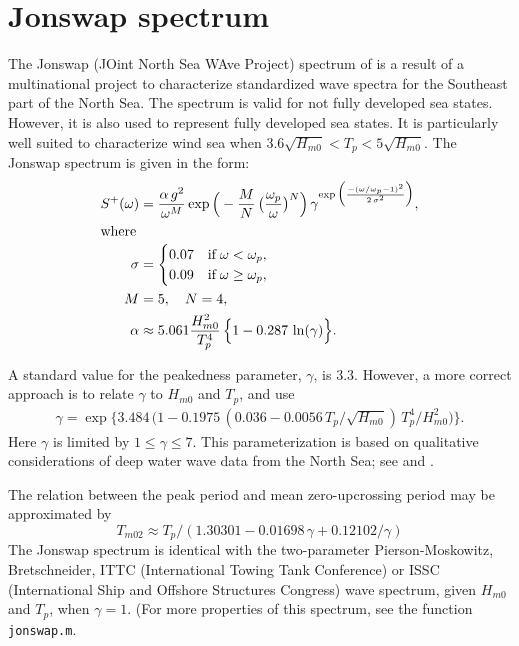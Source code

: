 \section{{\sc Jonswap} spectrum}
\label{sec:jonswap}
The {\sc Jonswap} (JOint North Sea WAve Project) spectrum of
\cite{HasselmannEtal1973Measurements}  is a result of a
multinational project to characterize standardized wave spectra for
the Southeast part of the North Sea. The spectrum is valid for not
fully developed sea states. However, it is also used to represent
fully developed sea states. It is particularly well suited to
characterize wind sea when $3.6 \sqrt{H_{m0}} < T_{p} < 5 \sqrt{H_{m0}}$.
The {\sc Jonswap} spectrum is given in the form:
 \begin{align}
   S^{+}(\omega ) &= \frac{\alpha \, g^{2}}{\omega ^{M}}
   \exp \Big( -\frac{M}{N} \, \big(   \frac{\omega _{p}}{\omega } \big)^{N} \Big) \,
   \gamma^{\exp \Big( \frac{-(\omega  / \omega _{p}-1)^{2}}{2 \, \sigma^{2}} \Big)},  \label{eq:jonswap} \\
\intertext{where}
\sigma &=  \begin{cases}
     0.07 & \text{if} \; \omega  < \omega _{p}, \\
     0.09 & \text{if} \; \omega  \ge \omega _{p},
    \end{cases} \nonumber \\
  M &= 5, \quad  N = 4, \nonumber \\
  \alpha &\approx 5.061 \frac{H_{m0}^{2}}{T_{p}^{4}} \,\Big\{ 1-0.287\, \ln(\gamma)  \Big\}. \nonumber
 \end{align}

A standard value for the peakedness parameter, $\gamma$, is
$3.3$. However, a more correct approach is
to relate $\gamma$ to $H_{m0}$ and $T_{p}$, and use
\begin{gather}
  \gamma = \exp \Big\{3.484 \,\big(1-0.1975\,(0.036-0.0056\,T_{p}/\sqrt{H_{m0}})
\,T_{p}^{4}/H_{m0}^2\big) \Big\} .
\end{gather}
Here $\gamma$ is limited by $1 \le \gamma \le 7$.
This parameterization is based on qualitative considerations of deep water
wave data from the North Sea; see
\cite{TorsethaugenEtal1984Characteristica} and \cite{HaverAndNyhus1986Wave}.

The relation between the peak period and mean zero-upcrossing period
may be approximated by
\begin{equation}
   T_{m02} \approx T_{p}/\left(1.30301-0.01698\,\gamma+0.12102/\gamma \right)
\end{equation}
The {\sc Jonswap} spectrum is identical with the two-parameter
Pierson-Moskowitz, Bretschneider,
ITTC (International Towing Tank Conference) or ISSC (International Ship and
Offshore Structures Congress) wave spectrum, given $H_{m0}$ and
$T_{p}$, when $\gamma=1$. (For more properties of this spectrum, see the \progname{} function
\verb+jonswap.m+.

